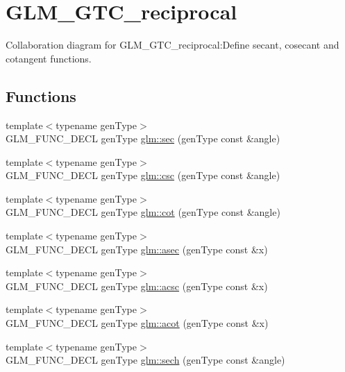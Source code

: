 \hypertarget{group__gtc__reciprocal}{
\section{GLM\_\-GTC\_\-reciprocal}
\label{group__gtc__reciprocal}
}


Collaboration diagram for GLM\_\-GTC\_\-reciprocal:Define secant, cosecant and cotangent functions.  
\subsection*{Functions}
\begin{CompactItemize}
\item 
{\footnotesize template$<$typename genType$>$ }\\GLM\_\-FUNC\_\-DECL genType \hyperlink{group__gtc__reciprocal_gef67dab7093a4d0ccc9c06ca05ddafd4}{glm::sec} (genType const \&angle)
\item 
{\footnotesize template$<$typename genType$>$ }\\GLM\_\-FUNC\_\-DECL genType \hyperlink{group__gtc__reciprocal_gdadd7293102fe18951a4acb4df1455a8}{glm::csc} (genType const \&angle)
\item 
{\footnotesize template$<$typename genType$>$ }\\GLM\_\-FUNC\_\-DECL genType \hyperlink{group__gtc__reciprocal_g8d3b73a481ad1115ca93da1410868e10}{glm::cot} (genType const \&angle)
\item 
{\footnotesize template$<$typename genType$>$ }\\GLM\_\-FUNC\_\-DECL genType \hyperlink{group__gtc__reciprocal_g79e2b1e9949a6c514eef05d462ab01a0}{glm::asec} (genType const \&x)
\item 
{\footnotesize template$<$typename genType$>$ }\\GLM\_\-FUNC\_\-DECL genType \hyperlink{group__gtc__reciprocal_g921be8522fbf0a5cfc877e78fb9abed2}{glm::acsc} (genType const \&x)
\item 
{\footnotesize template$<$typename genType$>$ }\\GLM\_\-FUNC\_\-DECL genType \hyperlink{group__gtc__reciprocal_ge06055493cfcf5e3732cf330d81fd186}{glm::acot} (genType const \&x)
\item 
{\footnotesize template$<$typename genType$>$ }\\GLM\_\-FUNC\_\-DECL genType \hyperlink{group__gtc__reciprocal_g6193b8e823dea616d6badca8076da066}{glm::sech} (genType const \&angle)
\item 

\end{CompactItemize}
